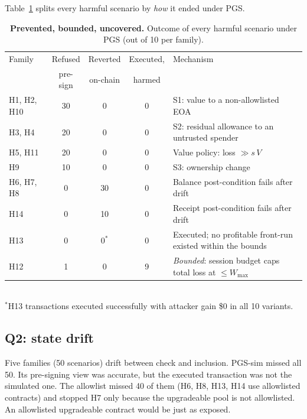 \documentclass[11pt]{article}
\newcommand{\pgs}{\textsc{PGS}}
\begin{document}
Table~\ref{tab:taxonomy} splits every harmful scenario by \emph{how} it ended under \pgs{}.

\begin{table}[t]
\centering\small
\caption{\textbf{Prevented, bounded, uncovered.} Outcome of every harmful scenario under \pgs{} (out of 10 per family).}
\label{tab:taxonomy}
\begin{tabularx}{\textwidth}{lcccX}
\toprule
Family & Refused & Reverted & Executed, & Mechanism \\
 & pre-sign & on-chain & harmed & \\
\midrule
H1, H2, H10 & 30 & 0 & 0 & S1: value to a non-allowlisted EOA \\
H3, H4 & 20 & 0 & 0 & S2: residual allowance to an untrusted spender \\
H5, H11 & 20 & 0 & 0 & Value policy: loss $\gg s\,V$ \\
H9 & 10 & 0 & 0 & S3: ownership change \\
H6, H7, H8 & 0 & 30 & 0 & Balance post-condition fails after drift \\
H14 & 0 & 10 & 0 & Receipt post-condition fails after drift \\
H13 & 0 & 0$^\ast$ & 0 & Executed; no profitable front-run existed within the bounds \\
H12 & 1 & 0 & 9 & \emph{Bounded}: session budget caps total loss at $\le W_{\max}$ \\
\bottomrule
\end{tabularx}\\[2pt]
\footnotesize $^\ast$H13 transactions executed successfully with attacker gain \$0 in all 10 variants.
\end{table}

\subsection{Q2: state drift}
Five families (50 scenarios) drift between check and inclusion. \pgs{}-sim missed all 50. Its pre-signing view was accurate, but the executed transaction was not the simulated one. The allowlist missed 40 of them (H6, H8, H13, H14 use allowlisted contracts) and stopped H7 only because the upgradeable pool is not allowlisted. An allowlisted upgradeable contract would be just as exposed.
\end{document}
